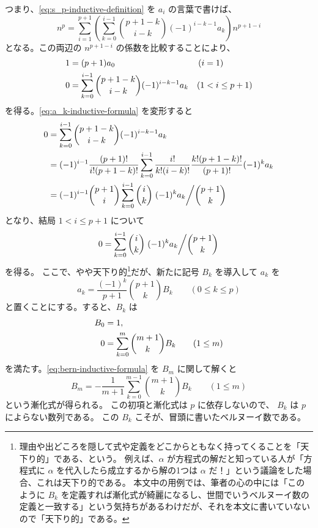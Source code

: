 {つまり、\autoref{eq:s_p-inductive-definition} を $a_i$ の言葉で書けば、
\[
  n^p=\sum_{i=1}^{p+1} \left(\sum_{k=0}^{i-1} \binom{p+1-k}{i-k} (-1)^{i-k-1} a_k\right) n^{p+1-i}
\]
となる。この両辺の $n^{p+1-i}$ の係数を比較することにより、
\begin{align}
  1&=(p+1)a_0 & (i&=1) \notag \\
  0&=\sum_{k=0}^{i-1} \binom{p+1-k}{i-k} (-1)^{i-k-1} a_k & (1&<i\le p+1) \label{eq:a_k-inductive-formula}
\end{align}
を得る。\autoref{eq:a_k-inductive-formula} を変形すると
\begin{align*}
  0&=\sum_{k=0}^{i-1} \binom{p+1-k}{i-k} (-1)^{i-k-1} a_k \\
   &=(-1)^{i-1}\frac{(p+1)!}{i!(p+1-k)!}\sum_{k=0}^{i-1} \frac{i!}{k!(i-k)!}\frac{k!(p+1-k)!}{(p+1)!} (-1)^{k} a_k \\
   &=(-1)^{i-1}\binom{p+1}{i} \sum_{k=0}^{i-1} \binom{i}{k}\left.(-1)^{k} a_k \middle/\binom{p+1}{k}\right.
\end{align*}
となり、結局 $1<i\le p+1$ について
\[
  0=\sum_{k=0}^{i-1} \binom{i}{k}\left.(-1)^{k} a_k \middle/\binom{p+1}{k}\right.
\]
を得る。
ここで、やや天下り的\footnote{%
理由や出どころを隠して式や定義をどこからともなく持ってくることを「天下り的」である、という。
例えば、$\alpha$ が方程式の解だと知っている人が「方程式に $\alpha$ を代入したら成立するから解の1つは $\alpha$ だ！」という議論をした場合、これは天下り的である。
本文中の用例では、筆者の心の中には「このように $B_k$ を定義すれば漸化式が綺麗になるし、世間でいうベルヌーイ数の定義と一致する」という気持ちがあるわけだが、それを本文に書いていないので「天下り的」である。
}だが、新たに記号 $B_k$ を導入して $a_k$ を
\begin{equation} \label{eq:bernoulli-number-and-coefficient}
  a_k=\frac{(-1)^{k}}{p+1}\binom{p+1}{k}B_{k} \qquad (0\le k\le p)
\end{equation}
と置くことにする。すると、$B_k$ は
\begin{align}
  B_0&=1, \notag \\
  0&=\sum_{k=0}^m \binom{m+1}{k} B_k \qquad (1\le m) \label{eq:bern-inductive-formula}
\end{align}
を満たす。\autoref{eq:bern-inductive-formula} を $B_m$ に関して解くと
\[
  B_m=-\frac{1}{m+1}\sum_{k=0}^{m-1} \binom{m+1}{k} B_k\qquad (1\le m)
\]
という漸化式が得られる。
この初項と漸化式は $p$ に依存しないので、 $B_k$ は $p$ によらない数列である。
この $B_k$ こそが、冒頭に書いたベルヌーイ数である。

}
